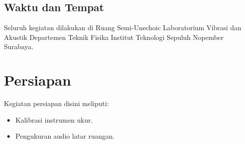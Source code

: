 \documentclass[12pt,]{article}
\begin{document}
	\subsection{Waktu dan Tempat}
	
	Seluruh kegiatan dilakukan di Ruang Semi-Unechoic Laboratorium Vibrasi dan Akustik
	Departemen Teknik Fisika Institut Teknologi Sepuluh Nopember Surabaya.
	
	
	\newpage
	\section{Persiapan}
	
	Kegiatan persiapan disini meliputi:
	\begin{itemize}
		\item Kalibrasi instrumen ukur.
		\item Pengukuran audio latar ruangan.
	\end{itemize}
\end{document}
